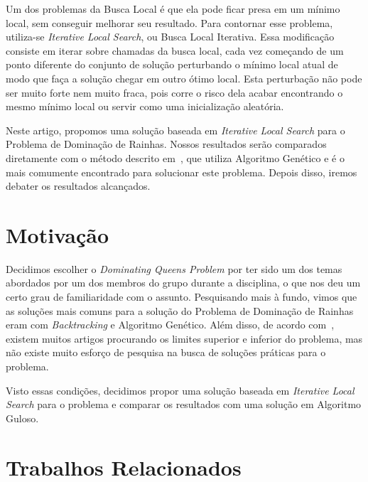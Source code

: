 \documentclass[sigconf]{acmart}
\begin{document}
Um dos problemas da Busca Local é que ela pode ficar presa em um mínimo local, sem conseguir melhorar
seu resultado. Para contornar esse problema, utiliza-se \textit{Iterative Local Search},
ou Busca Local Iterativa. Essa modificação consiste em iterar sobre chamadas da busca local, 
cada vez começando de um ponto diferente do conjunto de solução perturbando o mínimo local atual 
de modo que faça a solução chegar em outro ótimo local. Esta perturbação não pode ser muito forte nem 
muito fraca, pois corre o risco dela acabar encontrando o mesmo mínimo local ou servir como uma inicialização
aleatória.~\cite{lourencco2010iterated}

  Neste artigo, propomos uma solução baseada em \textit{Iterative Local Search} para o Problema de Dominação de Rainhas. 
  Nossos resultados serão comparados diretamente com o método descrito em~\cite{alharbi2017genetic}, 
que utiliza Algoritmo Genético e é o mais comumente encontrado para solucionar este problema. Depois disso, 
iremos debater os resultados alcançados.

\section{Motivação}

Decidimos escolher o \textit{Dominating Queens Problem} por ter sido um dos temas abordados por um dos
membros do grupo durante a disciplina, o que nos deu um certo grau de familiaridade com o assunto. Pesquisando mais
à fundo, vimos que as soluções mais comuns para a solução do Problema 
de Dominação de Rainhas eram com \textit{Backtracking} e Algoritmo Genético.
Além disso, de acordo com~\cite{alharbi2017genetic}, existem muitos artigos procurando
os limites superior e inferior do problema, mas não existe muito esforço de pesquisa
na busca de soluções práticas para o problema.

Visto essas condições, decidimos propor uma solução baseada em \textit{Iterative
Local Search} para o problema e comparar os resultados com uma solução em
Algoritmo Guloso.

\section{Trabalhos Relacionados}
\end{document}
